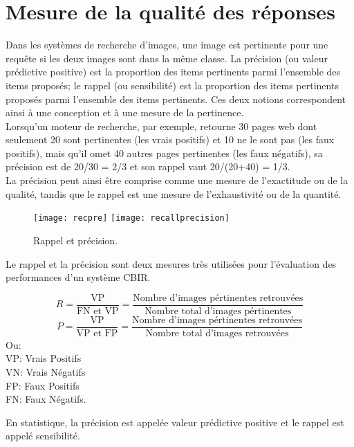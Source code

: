 \section{Mesure de la qualité des réponses}
Dans les systèmes de recherche d’images, une image est pertinente pour
une requête si les deux images sont dans la même classe.
La précision (ou valeur prédictive positive) est la proportion des items pertinents parmi l'ensemble des items proposés; le rappel (ou sensibilité) est la proportion des items pertinents proposés parmi l'ensemble des items pertinents. Ces deux notions correspondent ainsi à une conception et à une mesure de la pertinence.\\

Lorsqu'un moteur de recherche, par exemple, retourne 30 pages web dont seulement 20 sont pertinentes (les vrais positifs) et 10 ne le sont pas (les faux positifs), mais qu'il omet 40 autres pages pertinentes (les faux négatifs), sa précision est de 20/30 = 2/3 et son rappel vaut 20/(20+40) = 1/3.\\

La précision peut ainsi être comprise comme une mesure de l'exactitude ou de la qualité, tandis que le rappel est une mesure de l'exhaustivité ou de la quantité.\\


\begin{figure}[H]
	\texttt{[image: recpre]} 
	\texttt{[image: recallprecision]} 
	\caption{Rappel et précision.}
\end{figure}
Le rappel et la précision sont deux mesures très utilisées pour l’évaluation des performances d’un système CBIR. 

\begin{equation}
R = \frac{\text{VP}}{\text{FN et VP}} = \frac{\text{Nombre d'images pértinentes retrouvées} }{\text{Nombre total d'images pértinentes}}
\end{equation}
\begin{equation}
P = \frac{\text{VP}}{\text{VP et FP}} = \frac{\text{Nombre d'images pértinentes retrouvées}}{\text{Nombre total d'images retrouvées}}
\end{equation}
Ou: \\
VP: Vrais Positifs\\
VN: Vrais Négatifs\\
FP: Faux Positifs\\
FN: Faux Négatifs.
 
En statistique, la précision est appelée valeur prédictive positive et  le rappel est appelé sensibilité.\\

